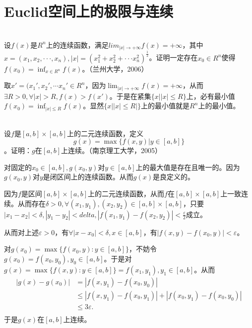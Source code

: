     \section{Euclid空间上的极限与连续}
    \begin{exercise}
    \hfill\\
  设$f(x)$是$R^n$上的连续函数，满足$lim_{|x|\rightarrow+\infty}f(x)=+\infty$，其中$x=(x_1,x_2,\cdot\cdot\cdot,x_n),|x|=(x_1^2+x_2^2+\cdot\cdot\cdot x_n^2)^{\frac12}$。证明一定存在$x_0\in R^n$使得$f(x_0)=\inf_{x\in R^n}f(x)$。（兰州大学，2006）
	
	取$x'=(x_1',x_2',\cdots x_n'\in R^n$，因为$\lim_{|x|\rightarrow+\infty}f(x)=+\infty$，从而$\exists R>0,\forall|x|>R,f(x)>f(x')$。于是在紧集$\{x||x|\leq R\}$上，必有最小值$f(x_0)=\inf_{|x|\leq R}f(x)$。显然$\{x||x|\leq R|\}$上的最小值就是$R^n上$的最小值。
	\end{exercise}
	\begin{exercise}
	\hfill\\
  设$f$是$[a,b]\times[a,b]$上的二元连续函数，定义$$g(x)=\max\{f(x,y)|y\in[a,b]\}$$。证明：$g$在$[a,b]$上连续。（南京理工大学，2005）
	
	对固定的$x_0\in[a,b],g(x_0,y)$对$y\in[a,b]$上的最大值是存在且唯一的。因为$g(x_0,y)$对$y$是闭区间上的连续函数。从而$g(x)$是良定义的。
	
	因为$f$是区间$[a,b]\times[a,b]$上的二元连续函数，从而$f$在$[a,b]\times[a,b]$上一致连续。从而存在$\delta>0,\forall(x_1,y_1),(x_2,y_2)\in[a,b]\times[a,b]$，只要$|x_1-x_2|<\delta,|y_1-y_2|<delta,|f(x_1,y_1)-f(x_2,y_2)|<\frac{\varepsilon}{2}$成立。
	
	从而对上述$\varepsilon>0$，有$\forall|x-x_0|<\delta,x\in[a,b]$，有$|f(x,y)-f(x_0,y)|<\varepsilon$。
	
	对$g(x_0)=\max\{f(x_0,y):y\in[a,b]\}$，不妨令$g(x_0)=f(x_0,y_0),y_0\in[a,b]$。于是对$g(x)=\max\{f(x,y):y\in[a,b]\}=f(x_1,y_1),y_1\in[a,b]$。从而
	$$
	\begin{aligned}
	|g(x)-g(x_0)|&=|f(x,y_1)-f(x_0,y_0)|\\
	&\leq|f(x,y_1)-f(x_0,y_1)|+|f(x_0,y_1)-f(x_0,y_0)|\\
	&\leq3\varepsilon.\\
	\end{aligned}
	$$
	于是$g(x)$在$[a,b]$上连续。
	\end{exercise}
	
